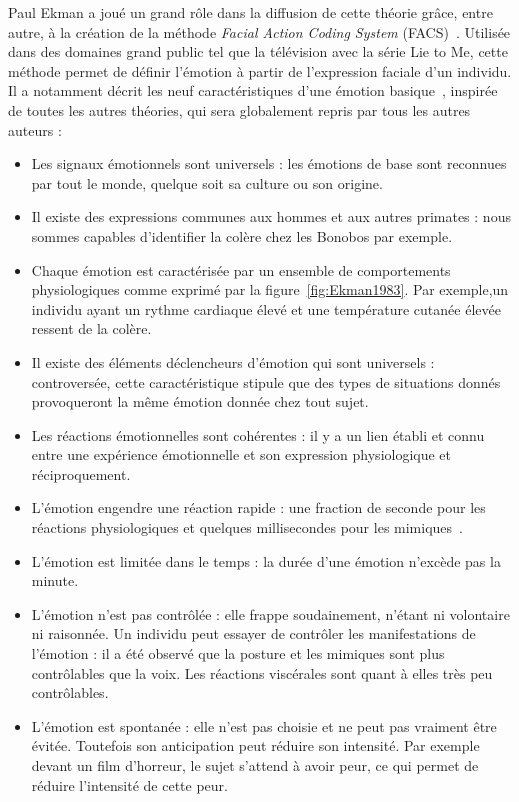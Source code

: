 Paul Ekman a joué un grand rôle dans la diffusion de cette théorie grâce, entre autre, à la création de la méthode \textit{Facial Action Coding System} (FACS)~\cite{Ekman1978}. Utilisée dans des domaines grand public tel que la télévision avec la série Lie to Me, cette méthode permet de définir l'émotion à partir de l'expression faciale d'un individu. Il a notamment décrit les neuf caractéristiques d'une émotion basique~\cite{Ekman1999}, inspirée de toutes les autres théories, qui sera globalement repris par tous les autres auteurs :
\begin{itemize}
  \item Les signaux émotionnels sont universels : les émotions de base sont reconnues par tout le monde, quelque soit sa culture ou son origine.
  \item Il existe des expressions communes aux hommes et aux autres primates : nous sommes capables d'identifier la colère chez les Bonobos par exemple.
  \item Chaque émotion est caractérisée par un ensemble de comportements physiologiques comme exprimé par la figure~\ref{fig:Ekman1983}. Par exemple,un individu ayant un rythme cardiaque élevé et une température cutanée élevée ressent de la colère.
  
  \item Il existe des éléments déclencheurs d'émotion qui sont universels : controversée, cette caractéristique stipule que des types de situations donnés provoqueront la même émotion donnée chez tout sujet.
  \item Les réactions émotionnelles sont cohérentes : il y a un lien établi et connu entre une expérience émotionnelle et son expression physiologique et réciproquement.
  \item L'émotion engendre une réaction rapide : une fraction de seconde pour les réactions physiologiques et quelques millisecondes pour les mimiques~\cite{Ekman1978}.
  \item L'émotion est limitée dans le temps : la durée d'une émotion n'excède pas la minute.
  \item L'émotion n'est pas contrôlée : elle frappe soudainement, n'étant ni volontaire ni raisonnée. Un individu peut essayer de contrôler les manifestations de l'émotion : il a été observé que la posture et les mimiques sont plus contrôlables que la voix. Les réactions viscérales sont quant à elles très peu contrôlables.
  \item L'émotion est spontanée : elle n'est pas choisie et ne peut pas vraiment être évitée. Toutefois son anticipation peut réduire son intensité. Par exemple devant un film d'horreur, le sujet s'attend à avoir peur, ce qui permet de réduire l'intensité de cette peur.
\end{itemize}

